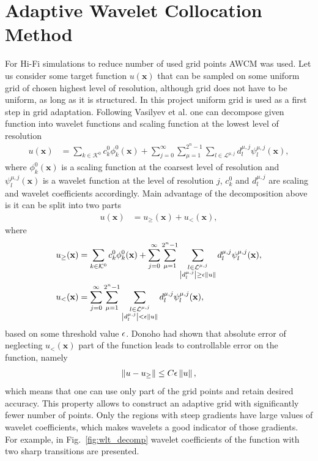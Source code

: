 \section{Adaptive Wavelet Collocation Method}
For Hi-Fi simulations to reduce number of used grid points AWCM was used. Let us consider some target function $u(\mathbf x)$ that can be sampled on some uniform grid of chosen highest level of resolution, although grid does not have to be uniform, as long as it is structured. In this project uniform grid is used as a first step in grid adaptation. Following Vasilyev et al. \cite{lib:wlt_main} one can decompose given function into wavelet functions and scaling function at the lowest level of resolution
\begin{align}
u(\mathbf x) &= \sum_{k \in \mathcal K^0} c_k^0 \phi_k^0 (\mathbf x) + \sum_{j = 0}^\infty \sum_{\mu = 1}^{2^n - 1} \sum_{l \in \mathcal L^{\mu, j}} d_l^{\mu, j} \psi_l^{\mu, j} (\mathbf x),
\end{align}
where $\phi_k^0(\mathbf x)$ is a scaling function at the coarsest level of resolution and $\psi_l^{\mu, j}(\mathbf x)$ is a wavelet function at the level of resolution $j$, $c_k^0$ and $d_l^{\mu, j}$ are scaling and wavelet coefficients accordingly. Main advantage of the decomposition above is it can be split into two parts
\begin{align}
u(\mathbf x) &= u_\ge (\mathbf x) + u_< (\mathbf x),
\end{align}
where
\begin{align}
\nonumber
u_\ge (\mathbf x) &= \sum_{k \in \mathcal K^0} c_k^0 \phi_k^0 (\mathbf x) + \sum_{j = 0}^\infty \sum_{\mu = 1}^{2^n - 1} \sum_{\substack{l \in \mathcal L^{\mu, j} \\ \left|d_l^{\mu, j}\right| \ge \epsilon \left\|u\right\| }} d_l^{\mu, j} \psi_l^{\mu, j} (\mathbf x), \\
u_<(\mathbf x) &= \sum_{j = 0}^\infty \sum_{\mu = 1}^{2^n - 1} \sum_{\substack{l \in \mathcal L^{\mu, j} \\ \left|d_l^{\mu, j}\right| < \epsilon \left\|u\right\| }} d_l^{\mu, j} \psi_l^{\mu, j} (\mathbf x),
\end{align}
based on some threshold value $\epsilon$. Donoho \cite{lib:donoho} had shown that absolute error of neglecting $u_<(\mathbf x)$ part of the function leads to controllable error on the function, namely
\begin{align}
\left\|u - u_\ge\right\| \le C \epsilon \left\|u\right\|,
\end{align}
which means that one can use only part of the grid points and retain desired accuracy. This property allows to construct an adaptive grid with significantly fewer number of points. Only the regions with steep gradients have large values of wavelet coefficients, which makes wavelets a good indicator of those gradients. For example, in Fig.~\ref{fig:wlt_decomp} wavelet coefficients of the function with two sharp transitions are presented.

